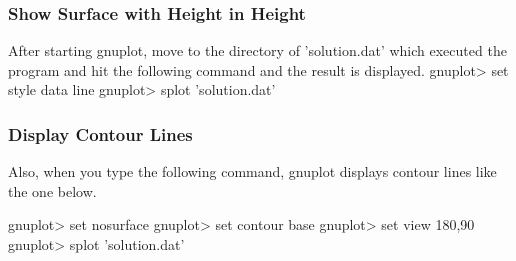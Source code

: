 \subsubsection{Show Surface with Height in Height}

After starting gnuplot, move to the directory of 'solution.dat' which executed the program and hit the following command and the result is displayed.
 gnuplot> set style data line
 gnuplot> splot 'solution.dat'

\subsubsection{Display Contour Lines}
Also, when you type the following command, gnuplot displays contour lines like the one below.

 gnuplot> set nosurface
 gnuplot> set contour base
 gnuplot> set view 180,90
 gnuplot> splot 'solution.dat'
 
 




